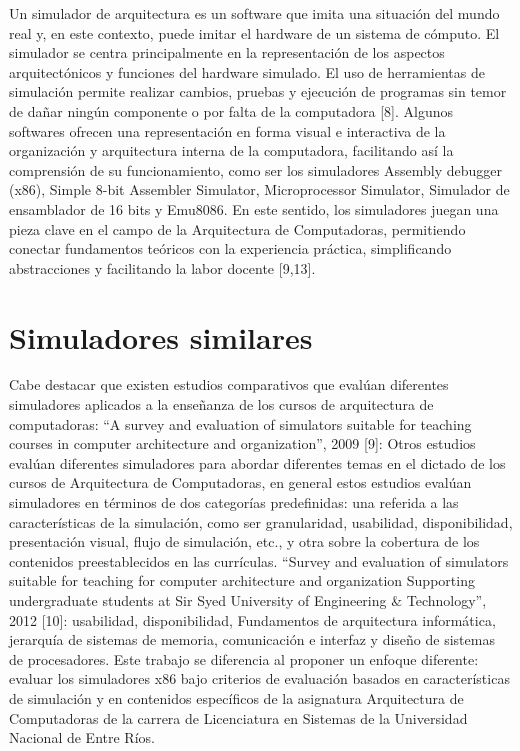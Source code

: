 \documentclass[12pt,twoside]{templates/unerthesis}
\begin{document}
Un simulador de arquitectura es un software que imita una situación del mundo real y, en este contexto, puede imitar el hardware de un sistema de cómputo. El simulador se centra principalmente en la representación de los aspectos arquitectónicos y funciones del hardware simulado. El uso de herramientas de simulación permite realizar cambios, pruebas y ejecución de programas sin temor de dañar ningún componente o por falta de la computadora {[}8{]}.
Algunos softwares ofrecen una representación en forma visual e interactiva de la organización y arquitectura interna de la computadora, facilitando así la comprensión de su funcionamiento, como ser los simuladores Assembly debugger (x86), Simple 8-bit Assembler Simulator, Microprocessor Simulator, Simulador de ensamblador de 16 bits y Emu8086. En este sentido, los simuladores juegan una pieza clave en el campo de la Arquitectura de Computadoras, permitiendo conectar fundamentos teóricos con la experiencia práctica, simpliﬁcando abstracciones y facilitando la labor docente {[}9,13{]}.

\hypertarget{simuladores-similares}{%
\section{Simuladores similares}\label{simuladores-similares}}

Cabe destacar que existen estudios comparativos que evalúan diferentes simuladores aplicados a la enseñanza de los cursos de arquitectura de computadoras:
``A survey and evaluation of simulators suitable for teaching courses in computer architecture and organization'', 2009 {[}9{]}: Otros estudios evalúan diferentes simuladores para abordar diferentes temas en el dictado de los cursos de Arquitectura de Computadoras, en general estos estudios evalúan simuladores en términos de dos categorías predefinidas: una referida a las características de la simulación, como ser granularidad, usabilidad, disponibilidad, presentación visual, flujo de simulación, etc., y otra sobre la cobertura de los contenidos preestablecidos en las currículas.
``Survey and evaluation of simulators suitable for teaching for computer architecture and organization Supporting undergraduate students at Sir Syed University of Engineering \& Technology'', 2012 {[}10{]}: usabilidad, disponibilidad, Fundamentos de arquitectura informática, jerarquía de sistemas de memoria, comunicación e interfaz y diseño de sistemas de procesadores.
Este trabajo se diferencia al proponer un enfoque diferente: evaluar los simuladores x86 bajo criterios de evaluación basados en características de simulación y en contenidos específicos de la asignatura Arquitectura de Computadoras de la carrera de Licenciatura en Sistemas de la Universidad Nacional de Entre Ríos.
\end{document}
